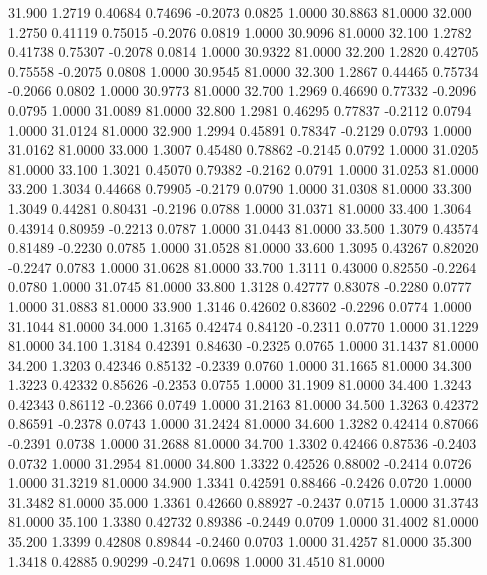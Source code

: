   31.900   1.2719   0.40684   0.74696  -0.2073   0.0825   1.0000  30.8863  81.0000
  32.000   1.2750   0.41119   0.75015  -0.2076   0.0819   1.0000  30.9096  81.0000
  32.100   1.2782   0.41738   0.75307  -0.2078   0.0814   1.0000  30.9322  81.0000
  32.200   1.2820   0.42705   0.75558  -0.2075   0.0808   1.0000  30.9545  81.0000
  32.300   1.2867   0.44465   0.75734  -0.2066   0.0802   1.0000  30.9773  81.0000
  32.700   1.2969   0.46690   0.77332  -0.2096   0.0795   1.0000  31.0089  81.0000
  32.800   1.2981   0.46295   0.77837  -0.2112   0.0794   1.0000  31.0124  81.0000
  32.900   1.2994   0.45891   0.78347  -0.2129   0.0793   1.0000  31.0162  81.0000
  33.000   1.3007   0.45480   0.78862  -0.2145   0.0792   1.0000  31.0205  81.0000
  33.100   1.3021   0.45070   0.79382  -0.2162   0.0791   1.0000  31.0253  81.0000
  33.200   1.3034   0.44668   0.79905  -0.2179   0.0790   1.0000  31.0308  81.0000
  33.300   1.3049   0.44281   0.80431  -0.2196   0.0788   1.0000  31.0371  81.0000
  33.400   1.3064   0.43914   0.80959  -0.2213   0.0787   1.0000  31.0443  81.0000
  33.500   1.3079   0.43574   0.81489  -0.2230   0.0785   1.0000  31.0528  81.0000
  33.600   1.3095   0.43267   0.82020  -0.2247   0.0783   1.0000  31.0628  81.0000
  33.700   1.3111   0.43000   0.82550  -0.2264   0.0780   1.0000  31.0745  81.0000
  33.800   1.3128   0.42777   0.83078  -0.2280   0.0777   1.0000  31.0883  81.0000
  33.900   1.3146   0.42602   0.83602  -0.2296   0.0774   1.0000  31.1044  81.0000
  34.000   1.3165   0.42474   0.84120  -0.2311   0.0770   1.0000  31.1229  81.0000
  34.100   1.3184   0.42391   0.84630  -0.2325   0.0765   1.0000  31.1437  81.0000
  34.200   1.3203   0.42346   0.85132  -0.2339   0.0760   1.0000  31.1665  81.0000
  34.300   1.3223   0.42332   0.85626  -0.2353   0.0755   1.0000  31.1909  81.0000
  34.400   1.3243   0.42343   0.86112  -0.2366   0.0749   1.0000  31.2163  81.0000
  34.500   1.3263   0.42372   0.86591  -0.2378   0.0743   1.0000  31.2424  81.0000
  34.600   1.3282   0.42414   0.87066  -0.2391   0.0738   1.0000  31.2688  81.0000
  34.700   1.3302   0.42466   0.87536  -0.2403   0.0732   1.0000  31.2954  81.0000
  34.800   1.3322   0.42526   0.88002  -0.2414   0.0726   1.0000  31.3219  81.0000
  34.900   1.3341   0.42591   0.88466  -0.2426   0.0720   1.0000  31.3482  81.0000
  35.000   1.3361   0.42660   0.88927  -0.2437   0.0715   1.0000  31.3743  81.0000
  35.100   1.3380   0.42732   0.89386  -0.2449   0.0709   1.0000  31.4002  81.0000
  35.200   1.3399   0.42808   0.89844  -0.2460   0.0703   1.0000  31.4257  81.0000
  35.300   1.3418   0.42885   0.90299  -0.2471   0.0698   1.0000  31.4510  81.0000
